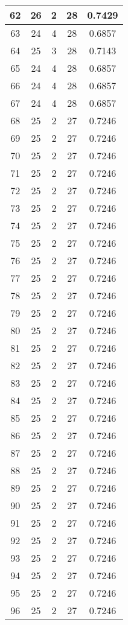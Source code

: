 \documentclass[letterpaper, 12pt]{article}
\begin{document}
\begin{longtable}{|c|c|c|c|c|}
\hline
62 & 26 & 2 & 28 & 0.7429 \\
\hline
63 & 24 & 4 & 28 & 0.6857 \\
\hline
64 & 25 & 3 & 28 & 0.7143 \\
\hline
65 & 24 & 4 & 28 & 0.6857 \\
\hline
66 & 24 & 4 & 28 & 0.6857 \\
\hline
67 & 24 & 4 & 28 & 0.6857 \\
\hline
68 & 25 & 2 & 27 & 0.7246 \\
\hline
69 & 25 & 2 & 27 & 0.7246 \\
\hline
70 & 25 & 2 & 27 & 0.7246 \\
\hline
71 & 25 & 2 & 27 & 0.7246 \\
\hline
72 & 25 & 2 & 27 & 0.7246 \\
\hline
73 & 25 & 2 & 27 & 0.7246 \\
\hline
74 & 25 & 2 & 27 & 0.7246 \\
\hline
75 & 25 & 2 & 27 & 0.7246 \\
\hline
76 & 25 & 2 & 27 & 0.7246 \\
\hline
77 & 25 & 2 & 27 & 0.7246 \\
\hline
78 & 25 & 2 & 27 & 0.7246 \\
\hline
79 & 25 & 2 & 27 & 0.7246 \\
\hline
80 & 25 & 2 & 27 & 0.7246 \\
\hline
81 & 25 & 2 & 27 & 0.7246 \\
\hline
82 & 25 & 2 & 27 & 0.7246 \\
\hline
83 & 25 & 2 & 27 & 0.7246 \\
\hline
84 & 25 & 2 & 27 & 0.7246 \\
\hline
85 & 25 & 2 & 27 & 0.7246 \\
\hline
86 & 25 & 2 & 27 & 0.7246 \\
\hline
87 & 25 & 2 & 27 & 0.7246 \\
\hline
88 & 25 & 2 & 27 & 0.7246 \\
\hline
89 & 25 & 2 & 27 & 0.7246 \\
\hline
90 & 25 & 2 & 27 & 0.7246 \\
\hline
91 & 25 & 2 & 27 & 0.7246 \\
\hline
92 & 25 & 2 & 27 & 0.7246 \\
\hline
93 & 25 & 2 & 27 & 0.7246 \\
\hline
94 & 25 & 2 & 27 & 0.7246 \\
\hline
95 & 25 & 2 & 27 & 0.7246 \\
\hline
96 & 25 & 2 & 27 & 0.7246 \\

\end{longtable}
\end{document}
